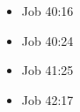 \documentclass[14pt]{article}
\begin{document}
\begin{multicols}{2}
\begin{itemize}
															\item Job 40:16
															
															\item Job 40:24
															
															\item Job 41:25
															
															\item Job 42:17
															
														\end{itemize}\end{multicols}
\end{document}
